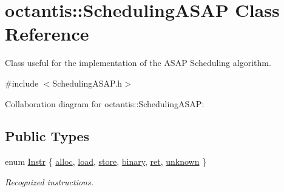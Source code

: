 \hypertarget{classoctantis_1_1SchedulingASAP}{}\section{octantis\+:\+:Scheduling\+A\+S\+AP Class Reference}
\label{classoctantis_1_1SchedulingASAP}


Class useful for the implementation of the A\+S\+AP Scheduling algorithm.  




{\ttfamily \#include $<$Scheduling\+A\+S\+A\+P.\+h$>$}



Collaboration diagram for octantis\+:\+:Scheduling\+A\+S\+AP\+:
\subsection*{Public Types}
\begin{DoxyCompactItemize}
\item 
enum \hyperlink{classoctantis_1_1SchedulingASAP_abbd454a56c823d34f835168cc31168f4}{Instr} \{ \newline
\hyperlink{classoctantis_1_1SchedulingASAP_abbd454a56c823d34f835168cc31168f4a1541025cbb5cba48df7df02b247dda94}{alloc}, 
\hyperlink{classoctantis_1_1SchedulingASAP_abbd454a56c823d34f835168cc31168f4a243ac5e1764c17c614cd1593d856ded7}{load}, 
\hyperlink{classoctantis_1_1SchedulingASAP_abbd454a56c823d34f835168cc31168f4a825e4d8f229ce85bc8798614cca89237}{store}, 
\hyperlink{classoctantis_1_1SchedulingASAP_abbd454a56c823d34f835168cc31168f4a71eabbb5cc7e271dc91aadc47e10cf97}{binary}, 
\newline
\hyperlink{classoctantis_1_1SchedulingASAP_abbd454a56c823d34f835168cc31168f4a5972668297576ba95cec790b0628aa7a}{ret}, 
\hyperlink{classoctantis_1_1SchedulingASAP_abbd454a56c823d34f835168cc31168f4a5871b82eb2922df94c8bc366c8ad158f}{unknown}
 \}\begin{DoxyCompactList}\small\item\em Recognized instructions. \end{DoxyCompactList}
\end{DoxyCompactItemize}
